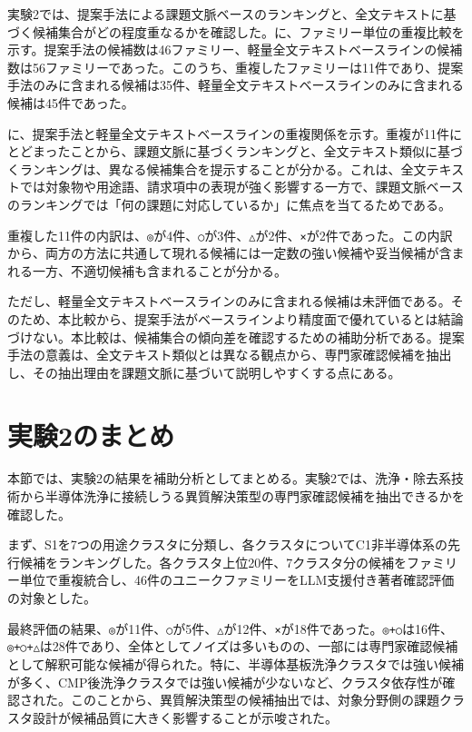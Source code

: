 実験2では、提案手法による課題文脈ベースのランキングと、全文テキストに基づく候補集合がどの程度重なるかを確認した。に、ファミリー単位の重複比較を示す。提案手法の候補数は46ファミリー、軽量全文テキストベースラインの候補数は56ファミリーであった。このうち、重複したファミリーは11件であり、提案手法のみに含まれる候補は35件、軽量全文テキストベースラインのみに含まれる候補は45件であった。

に、提案手法と軽量全文テキストベースラインの重複関係を示す。重複が11件にとどまったことから、課題文脈に基づくランキングと、全文テキスト類似に基づくランキングは、異なる候補集合を提示することが分かる。これは、全文テキストでは対象物や用途語、請求項中の表現が強く影響する一方で、課題文脈ベースのランキングでは「何の課題に対応しているか」に焦点を当てるためである。

重複した11件の内訳は、\texttt{◎}が4件、\texttt{○}が3件、\texttt{△}が2件、\texttt{×}が2件であった。この内訳から、両方の方法に共通して現れる候補には一定数の強い候補や妥当候補が含まれる一方、不適切候補も含まれることが分かる。

ただし、軽量全文テキストベースラインのみに含まれる候補は未評価である。そのため、本比較から、提案手法がベースラインより精度面で優れているとは結論づけない。本比較は、候補集合の傾向差を確認するための補助分析である。提案手法の意義は、全文テキスト類似とは異なる観点から、専門家確認候補を抽出し、その抽出理由を課題文脈に基づいて説明しやすくする点にある。

\section{実験2のまとめ}

本節では、実験2の結果を補助分析としてまとめる。実験2では、洗浄・除去系技術から半導体洗浄に接続しうる異質解決策型の専門家確認候補を抽出できるかを確認した。

まず、S1を7つの用途クラスタに分類し、各クラスタについてC1非半導体系の先行候補をランキングした。各クラスタ上位20件、7クラスタ分の候補をファミリー単位で重複統合し、46件のユニークファミリーをLLM支援付き著者確認評価の対象とした。

最終評価の結果、\texttt{◎}が11件、\texttt{○}が5件、\texttt{△}が12件、\texttt{×}が18件であった。\texttt{◎+○}は16件、\texttt{◎+○+△}は28件であり、全体としてノイズは多いものの、一部には専門家確認候補として解釈可能な候補が得られた。特に、半導体基板洗浄クラスタでは強い候補が多く、CMP後洗浄クラスタでは強い候補が少ないなど、クラスタ依存性が確認された。このことから、異質解決策型の候補抽出では、対象分野側の課題クラスタ設計が候補品質に大きく影響することが示唆された。

